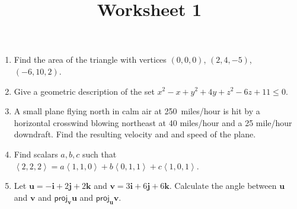 \documentclass[12pt]{article}
\title{Worksheet 1}
\author{}\date{}
\begin{document}
\maketitle
\thispagestyle{empty}

\begin{enumerate}
\item Find the area of the triangle with vertices
$\left(0,0,0\right)$, $\left(2,4,-5\right)$,
$\left(-6,10,2\right)$. %

\item Give a geometric description of the set
$x^2-x+y^2+4y+z^2-6z+11\le 0$.

\item A small plane flying north in calm air at
250~miles/hour is hit by a horizontal crosswind blowing
northeast at 40 miles/hour and a 25 mile/hour downdraft.
Find the resulting velocity and and speed of the plane.
\item Find scalars $a,b,c$ such that
$\left\langle 2,2,2\right\rangle
=a\left\langle 1,1,0\right\rangle
+b\left\langle 0,1,1\right\rangle
+c\left\langle 1,0,1\right\rangle$.

\item Let $\mathbold{u}=-\mathbold{i}+2\mathbold{j}+2\mathbold{k}$
and $\mathbold{v}=3\mathbold{i}+6\mathbold{j}+6\mathbold{k}$.
Calculate the angle between $\mathbold{u}$ and $\mathbold{v}$
and $\mathsf{proj}_\mathbold{v}\mathbold{u}$
and $\mathsf{proj}_\mathbold{u}\mathbold{v}$.


\end{enumerate}
\end{document}
